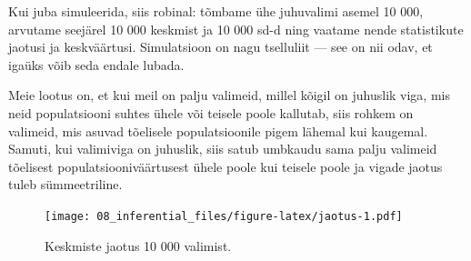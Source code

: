 \documentclass[]{book}
\newenvironment{Shaded}{\begin{snugshade}}{\end{snugshade}}
\newcommand{\KeywordTok}[1]{\textcolor[rgb]{0.13,0.29,0.53}{\textbf{#1}}}
\newcommand{\DataTypeTok}[1]{\textcolor[rgb]{0.13,0.29,0.53}{#1}}
\newcommand{\DecValTok}[1]{\textcolor[rgb]{0.00,0.00,0.81}{#1}}
\newcommand{\StringTok}[1]{\textcolor[rgb]{0.31,0.60,0.02}{#1}}
\newcommand{\CommentTok}[1]{\textcolor[rgb]{0.56,0.35,0.01}{\textit{#1}}}
\newcommand{\OperatorTok}[1]{\textcolor[rgb]{0.81,0.36,0.00}{\textbf{#1}}}
\newcommand{\NormalTok}[1]{#1}
\begin{document}
Kui juba simuleerida, siis robinal: tõmbame ühe juhuvalimi asemel 10
000, arvutame seejärel 10 000 keskmist ja 10 000 sd-d ning vaatame nende
statistikute jaotusi ja keskväärtusi. Simulatsioon on nagu tselluliit
--- see on nii odav, et igaüks võib seda endale lubada.

Meie lootus on, et kui meil on palju valimeid, millel kõigil on juhuslik
viga, mis neid populatsiooni suhtes ühele või teisele poole kallutab,
siis rohkem on valimeid, mis asuvad tõelisele populatsioonile pigem
lähemal kui kaugemal. Samuti, kui valimiviga on juhuslik, siis satub
umbkaudu sama palju valimeid tõelisest populatsiooniväärtusest ühele
poole kui teisele poole ja vigade jaotus tuleb sümmeetriline.



\begin{Shaded}
\end{Shaded}

\begin{figure}
\centering
\texttt{[image: 08\_inferential\_files/figure-latex/jaotus-1.pdf]}
\caption{\label{fig:jaotus}Keskmiste jaotus 10 000 valimist.}
\end{figure}

\begin{Shaded}
\end{Shaded}
\end{document}
